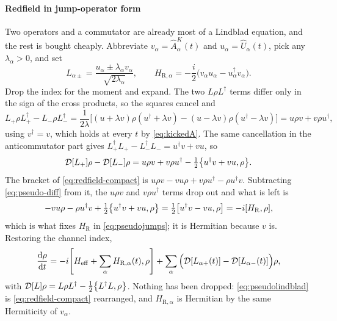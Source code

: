 \documentclass[a4paper,11pt]{article}
\newcommand{\Dcal}{\mathcal{D}}
\newcommand{\eff}{\mathrm{eff}}
\begin{document}
\paragraph{Redfield in jump-operator form}
Two operators and a commutator are already most of a Lindblad equation, and the rest is bought cheaply. Abbreviate $v_\alpha = \hat A^K_\alpha(t)$ and $u_\alpha = \hat U_\alpha(t)$, pick any $\lambda_\alpha>0$, and set
\begin{equation}\label{eq:pseudojumps}
  L_{\alpha\pm} = \frac{u_\alpha \pm \lambda_\alpha v_\alpha}{\sqrt{2\lambda_\alpha}},
  \qquad
  H_{\mathrm{R},\alpha} = -\frac{i}{2}\big(v_\alpha u_\alpha - u_\alpha^\dagger v_\alpha\big).
\end{equation}
Drop the index for the moment and expand. The two $L\rho L^\dagger$ terms differ only in the sign of the cross products, so the squares cancel and
\begin{equation}\label{eq:pseudo-jumpterms}
  L_+\rho L_+^\dagger - L_-\rho L_-^\dagger
  = \frac{1}{2\lambda}\Big[(u+\lambda v)\rho(u^\dagger+\lambda v) - (u-\lambda v)\rho(u^\dagger-\lambda v)\Big]
  = u\rho v + v\rho u^\dagger ,
\end{equation}
using $v^\dagger = v$, which holds at every $t$ by \eqref{eq:kickedA}. The same cancellation in the anticommutator part gives $L_+^\dagger L_+ - L_-^\dagger L_- = u^\dagger v + vu$, so
\begin{equation}\label{eq:pseudo-diff}
  \Dcal[L_+]\rho - \Dcal[L_-]\rho
  = u\rho v + v\rho u^\dagger - \tfrac12\acomm{u^\dagger v + vu}{\rho} .
\end{equation}
The bracket of \eqref{eq:redfield-compact} is $u\rho v - vu\rho + v\rho u^\dagger - \rho u^\dagger v$. Subtracting \eqref{eq:pseudo-diff} from it, the $u\rho v$ and $v\rho u^\dagger$ terms drop out and what is left is
\begin{equation}\label{eq:pseudo-remainder}
  -vu\rho - \rho u^\dagger v + \tfrac12\acomm{u^\dagger v + vu}{\rho}
  = \tfrac12\comm{u^\dagger v - vu}{\rho}
  = -i\comm{H_{\mathrm{R}}}{\rho},
\end{equation}
which is what fixes $H_{\mathrm{R}}$ in \eqref{eq:pseudojumps}; it is Hermitian because $v$ is. Restoring the channel index,
\begin{equation}\label{eq:pseudolindblad}
  \dv{\rho}{t} = -i\comm{H_\eff + \sum_\alpha H_{\mathrm{R},\alpha}(t)}{\rho}
  + \sum_\alpha\Big(\Dcal[L_{\alpha+}(t)] - \Dcal[L_{\alpha-}(t)]\Big)\rho ,
\end{equation}
with $\Dcal[L]\rho = L\rho L^\dagger - \tfrac12\acomm{L^\dagger L}{\rho}$. Nothing has been dropped: \eqref{eq:pseudolindblad} is \eqref{eq:redfield-compact} rearranged, and $H_{\mathrm{R},\alpha}$ is Hermitian by the same Hermiticity of $v_\alpha$.
\end{document}
